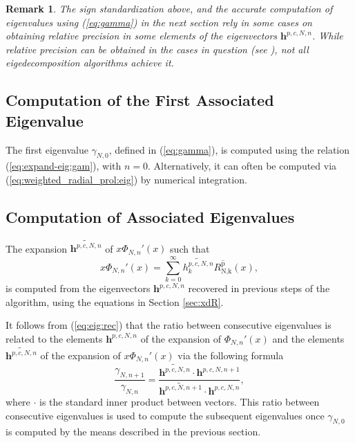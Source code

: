 \documentclass[12pt]{article}
\newtheorem{remark}{Remark}
\begin{document}
\begin{remark}\label{remark:eig_alg}
The sign standardization above, and the accurate computation of eigenvalues using  (\ref{eq:gamma}) in the next section rely in some cases on obtaining relative precision in some elements of the eigenvectors ${\bm h}^{p,c,N,n}$. 
While relative precision can be obtained in the cases in question (see \cite{osipov2017evaluation}), not all eigedecomposition algorithms achieve it. 
\end{remark}

%
%
%
\subsection{Computation of the First Associated Eigenvalue}

The first eigenvalue $\gamma_{N,0}$, defined in (\ref{eq:gamma}), is computed using the relation (\ref{eq:expand-eig:gam}), with $n=0$.
Alternatively, it can often be computed via (\ref{eq:weighted_radial_prol:eig}) by  numerical integration.




%
%
%
\subsection{Computation of Associated Eigenvalues}

The expansion $\widetilde{{\bm h}^{p,c,N,n}}$ of $x \Phi_{N,n}'(x)$ such that 
\begin{equation}
  x \Phi_{N,n}'(x) = \sum_{k=0}^{\infty} \widetilde{{h}^{p,c,N,n}_k} \overline{R_{\text{N,k}}^{\text{p}}}(x) ,
\end{equation}
is computed from the eigenvectors ${{\bm h}^{p,c,N,n}}$ recovered in previous steps of the algorithm,  using the equations in Section \ref{sec:xdR}.

It follows from (\ref{eq:eig:rec}) that the ratio between consecutive eigenvalues is related to the elements  ${{\bm h}^{p,c,N,n}}$ of the expansion of  $\Phi_{N,n}'(x)$ and the elements $\widetilde{{\bm h}^{p,c,N,n}}$ of the expansion of $x \Phi_{N,n}'(x)$ via the following formula
\begin{equation}
  \frac{\gamma_{N,n+1}}{\gamma_{N,n}} = \frac{ \widetilde{{\bm h}^{p,c,N,n}}\cdot {{\bm h}^{p,c,N,n+1}}  }{  \widetilde{{\bm h}^{p,c,N,n+1}}\cdot {{\bm h}^{p,c,N,n}} } ,
\end{equation}
where $\cdot$ is the standard inner product between vectors.
This ratio between consecutive eigenvalues is used to compute the subsequent eigenvalues once $\gamma_{N,0}$ is computed by the means described in the previous section.
\end{document}
